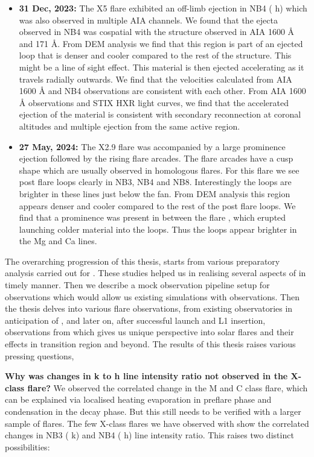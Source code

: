 \begin{enumerate}
\begin{itemize}[label=]
        \item {\bf 31 Dec, 2023:} The X5 flare exhibited an off-limb ejection in NB4 ( h) which was also observed in multiple AIA channels. We found that the ejecta observed in NB4 was cospatial with the structure observed in AIA 1600 {\AA} and 171 {\AA}. From DEM analysis we find that this region is part of an ejected loop that is denser and cooler compared to the rest of the structure. This might be a line of sight effect. This material is then ejected accelerating as it travels radially outwards. We find that the velocities calculated from AIA 1600 {\AA} and {\suit} NB4 observations are consistent with each other. From AIA 1600 {\AA} observations and STIX HXR light curves, we find that the accelerated ejection of the material is consistent with secondary reconnection at coronal altitudes and multiple ejection from the same active region. 
        
        \item {\bf 27 May, 2024:} The X2.9 flare was accompanied by a large prominence ejection followed by the rising flare arcades. The flare arcades have a cusp shape which are usually observed in homologous flares. For this flare we see post flare loops clearly in NB3, NB4 and NB8. Interestingly the loops are brighter in these lines just below the fan. From DEM analysis this region appears denser and cooler compared to the rest of the post flare loops. We find that a prominence was present in between the flare , which erupted launching colder material into the loops. Thus the loops appear brighter in the Mg and Ca lines. 
    \end{itemize}
 
\end{enumerate}

The overarching progression of this thesis, starts from various preparatory analysis carried out for {\suit}. These studies helped us in realising several aspects of {\suit} in timely manner. Then we describe a mock observation pipeline setup for {\suit} observations which would allow us existing simulations with observations. Then the thesis delves into various flare observations, from existing observatories in anticipation of {\suit}, and later on, after successful launch and L1 insertion, observations from {\suit} which gives us unique perspective into solar flares and their effects in transition region and beyond. The results of this thesis raises various pressing questions,

\noindent
{\bf Why was changes in  k to h line intensity ratio not observed in the X-class flare?} We observed the correlated change in the M and C class flare, which can be explained via localised heating evaporation in preflare phase and condensation in the decay phase. But this still needs to be verified with a larger sample of flares. The few X-class flares we have observed with {\suit} show the correlated changes in NB3 ( k) and NB4 ( h) line intensity ratio. This raises two distinct possibilities:

